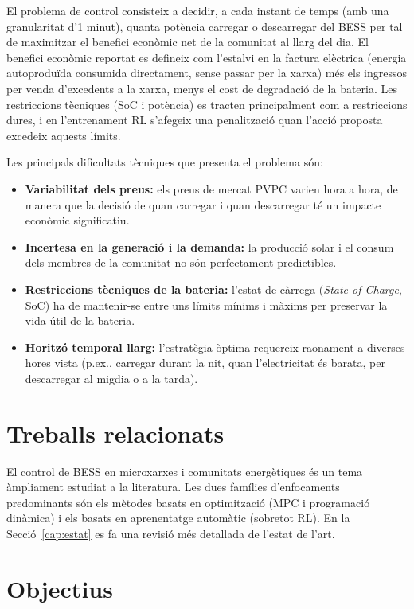 \documentclass[a4paper,12pt,twoside]{ThesisStyle}
\begin{document}
El problema de control consisteix a decidir, a cada instant de temps (amb una granularitat d'1 minut), quanta potència carregar o descarregar del BESS per tal de maximitzar el benefici econòmic net de la comunitat al llarg del dia. El benefici econòmic reportat es defineix com l'estalvi en la factura elèctrica (energia autoproduïda consumida directament, sense passar per la xarxa) més els ingressos per venda d'excedents a la xarxa, menys el cost de degradació de la bateria. Les restriccions tècniques (SoC i potència) es tracten principalment com a restriccions dures, i en l'entrenament RL s'afegeix una penalització quan l'acció proposta excedeix aquests límits.

Les principals dificultats tècniques que presenta el problema són:
\begin{itemize}
    \item \textbf{Variabilitat dels preus:} els preus de mercat PVPC varien hora a hora, de manera que la decisió de quan carregar i quan descarregar té un impacte econòmic significatiu.
    \item \textbf{Incertesa en la generació i la demanda:} la producció solar i el consum dels membres de la comunitat no són perfectament predictibles.
    \item \textbf{Restriccions tècniques de la bateria:} l'estat de càrrega (\textit{State of Charge}, SoC) ha de mantenir-se entre uns límits mínims i màxims per preservar la vida útil de la bateria.
    \item \textbf{Horitzó temporal llarg:} l'estratègia òptima requereix raonament a diverses hores vista (p.ex., carregar durant la nit, quan l'electricitat és barata, per descarregar al migdia o a la tarda).
\end{itemize}

\section{Treballs relacionats}

El control de BESS en microxarxes i comunitats energètiques és un tema àmpliament estudiat a la literatura. Les dues famílies d'enfocaments predominants són els mètodes basats en optimització (MPC i programació dinàmica) i els basats en aprenentatge automàtic (sobretot RL). En la Secció~\ref{cap:estat} es fa una revisió més detallada de l'estat de l'art.

\section{Objectius}
\end{document}

